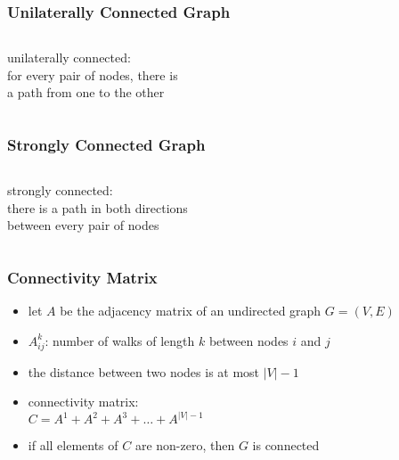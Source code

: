 \documentclass[dvipsnames]{beamer}
\begin{document}
\begin{frame}
  \frametitle{Unilaterally Connected Graph}

  \begin{columns}
    \begin{definition}
      \alert{unilaterally} connected:\\
      for every pair of nodes, there is\\
      a path from one to the other
    \end{definition}

    \begin{example}
      \begin{center}
      \end{center}
    \end{example}
  \end{columns}
\end{frame}

\begin{frame}
  \frametitle{Strongly Connected Graph}

  \begin{columns}
    \begin{definition}
      \alert{strongly} connected:\\
      there is a path in both directions\\
      between every pair of nodes
    \end{definition}

    \begin{example}
      \begin{center}
      \end{center}
    \end{example}
  \end{columns}
\end{frame}

\begin{frame}
  \frametitle{Connectivity Matrix}

  \begin{itemize}
    \item let $A$ be the adjacency matrix of an undirected graph $G=(V,E)$
    \item $A^k_{ij}$: number of walks of length $k$
      between nodes $i$ and $j$

    \item the distance between two nodes is at most $|V|-1$

    \pause
    \medskip
    \item connectivity matrix:\\
      $C = A^1 + A^2 + A^3 + \dots + A^{|V|-1}$
    \item if all elements of $C$ are non-zero, then $G$ is connected
  \end{itemize}
\end{frame}
\end{document}
